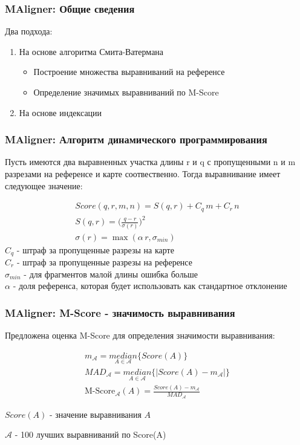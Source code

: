 \begin{frame}
\frametitle{MAligner\nocite{maligner}: Общие сведения}
Два подхода:
\begin{enumerate}
  \item На основе алгоритма Смита-Ватермана
  \begin{itemize}
    \item Построение множества выравниваний на референсе
    \item Определение значимых выравниваний по M-Score
  \end{itemize}
  \item На основе индексации
\end{enumerate}
\end{frame}

\begin{frame}
\frametitle{MAligner: Алгоритм динамического программирования}

Пусть имеются два выравненных участка длины r и q с пропущенными n и m разрезами на референсе и карте соотвественно.
Тогда выравнивание имеет следующее значение:

\begin{gather*}
Score(q, r, m, n) = S(q, r) + C_q \,m + C_r \, n \\
S(q, r) = \bigg(\frac{q - r}{\sigma(r)}\bigg)^2 \\
\sigma(r) = \max(\alpha \, r, \sigma_{min})
\end{gather*}
$C_q$ - штраф за пропущенные разрезы на карте \\
$C_r$ - штраф за пропущенные разрезы на референсе \\
$\sigma_{min}$ - для фрагментов малой длины ошибка больше \\
$\alpha$ - доля референса, которая будет использовать как стандартное отклонение
\end{frame}

\begin{frame}
\frametitle{MAligner: M-Score - значимость выравнивания}

Предложена оценка M-Score для определения значимости выравнивания:

\begin{gather*}
  m_{\mathcal{A}} = \underset{A \in \mathcal{A}}{median}\{Score(A)\} \\
  MAD_{\mathcal{A}} = \underset{A \in \mathcal{A}}{median}\{ | Score(A) - m_{\mathcal{A}}|\} \\
  \text{M-Score}_{\mathcal{A}}(A) = \frac{Score(A) - m_{\mathcal{A}}}{MAD_{\mathcal{A}}}
\end{gather*}

$Score(A)$ - значение выравнивания $A$

$\mathcal{A}$ - 100 лучших выравниваний по Score(A)
\end{frame}


